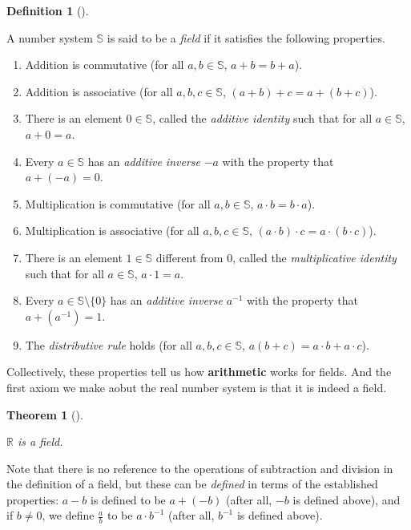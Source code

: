 \documentclass[
  letterpaper,
  DIV=11,
  numbers=noendperiod]{scrreprt}
\providecommand{\tightlist}{%
  \setlength{\itemsep}{0pt}\setlength{\parskip}{0pt}}
\def\R{\mathbb R}
\theoremstyle{plain}
\newtheorem{theorem}{Theorem}[chapter]
\theoremstyle{definition}
\theoremstyle{plain}
\theoremstyle{plain}
\theoremstyle{definition}
\theoremstyle{definition}
\newtheorem{definition}{Definition}[chapter]
\theoremstyle{remark}
\begin{document}
\begin{definition}[]\protect\hypertarget{def-field}{}\label{def-field}

A number system \(\mathbb{S}\) is said to be a \emph{field} if it
satisfies the following properties.

\begin{enumerate}
\def\labelenumi{\arabic{enumi}.}
\tightlist
\item
  Addition is commutative (for all \(a,b\in\mathbb{S}\), \(a+b=b+a\)).
\item
  Addition is associative (for all \(a,b,c\in\mathbb{S}\),
  \((a+b)+c=a+(b+c)\)).
\item
  There is an element \(0\in\mathbb{S}\), called the \emph{additive
  identity} such that for all \(a\in\mathbb{S}\), \(a+0=a\).
\item
  Every \(a\in\mathbb{S}\) has an \emph{additive inverse} \(-a\) with
  the property that \(a+(-a)=0\).
\item
  Multiplication is commutative (for all \(a,b\in\mathbb{S}\),
  \(a\cdot b=b\cdot a\)).
\item
  Multiplication is associative (for all \(a,b,c\in\mathbb{S}\),
  \((a\cdot b)\cdot c=a\cdot(b\cdot c)\)).
\item
  There is an element \(1\in\mathbb{S}\) different from 0, called the
  \emph{multiplicative identity} such that for all \(a\in\mathbb{S}\),
  \(a\cdot 1=a\).
\item
  Every \(a\in\mathbb{S}\setminus\{0\}\) has an \emph{additive inverse}
  \(a^{-1}\) with the property that \(a+(a^{-1})=1\).
\item
  The \emph{distributive rule} holds (for all \(a,b,c\in\mathbb{S}\),
  \(a(b+c)=a\cdot b+a\cdot c\)).
\end{enumerate}

\end{definition}

Collectively, these properties tell us how \textbf{arithmetic} works for
fields. And the first axiom we make aobut the real number system is that
it is indeed a field.

\begin{theorem}[]\protect\hypertarget{thm-ax-field}{}\label{thm-ax-field}

\(\R\) is a field.

\end{theorem}

Note that there is no reference to the operations of subtraction and
division in the definition of a field, but these can be \emph{defined}
in terms of the established properties: \(a-b\) is defined to be
\(a+(-b)\) (after all, \(-b\) is defined above), and if \(b\neq0\), we
define \(\frac{a}{b}\) to be \(a\cdot b^{-1}\) (after all, \(b^{-1}\) is
defined above).
\end{document}
